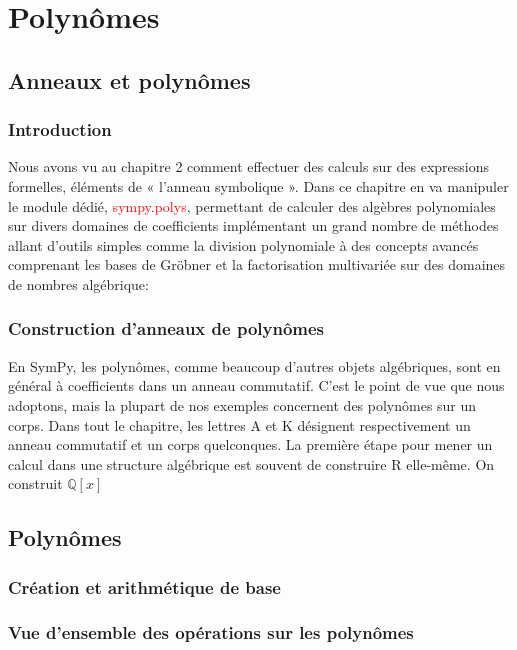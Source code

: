 \chapter{Polynômes}
 \section{Anneaux et polynômes}
  \subsection{Introduction}
 Nous avons vu au chapitre 2 comment effectuer des calculs sur des expressions formelles, éléments de « l'anneau symbolique ». Dans ce chapitre en va manipuler le module dédié, \textcolor{red}{sympy.polys}, permettant de calculer des algèbres polynomiales sur divers domaines de coefficients implémentant un grand nombre de méthodes  allant d’outils simples comme la division polynomiale à des concepts avancés comprenant les bases de Gröbner et la factorisation multivariée sur des domaines de nombres algébrique:
  \subsection{ Construction d’anneaux de polynômes}
En SymPy, les polynômes, comme beaucoup d’autres objets algébriques, sont en général à coefficients dans un anneau commutatif. C’est le point de vue que nous adoptons, mais la plupart de nos exemples concernent des polynômes sur un corps. Dans tout le chapitre, les lettres A et K désignent respectivement un anneau commutatif et un corps quelconques. La première étape pour mener un calcul dans une structure algébrique est souvent de construire R elle-même. On construit $\mathbb{Q}\left[x\right]$
 \section{Polynômes}
  \subsection{Création et arithmétique de base}
  \subsection{Vue d’ensemble des opérations sur les polynômes}
